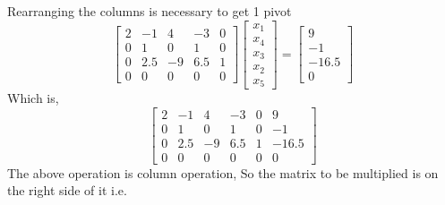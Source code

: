 \documentclass[11pt,a4paper]{article}
\begin{document}
Rearranging the columns is necessary to get 1 pivot
\[
    \begin{bmatrix}
        2 & -1    & 4  & -3  & 0\\
        0 & 1     & 0  & 1   & 0\\
        0 & 2.5   & -9 & 6.5 & 1\\
        0 & 0     & 0  & 0   & 0 
    \end{bmatrix} \begin{bmatrix}
                    x_1 \\ x_4 \\ x_3 \\ x_2 \\ x_5
                 \end{bmatrix} = \begin{bmatrix}
                                    9 \\ -1 \\ -16.5 \\ 0
                                 \end{bmatrix} \] Which is,
\[                                 
\left[{\begin{array}{ccccc|c}
        2 & -1    & 4  & -3  & 0 & 9\\
        0 & 1     & 0  & 1   & 0 & -1\\
        0 & 2.5   & -9 & 6.5 & 1 & -16.5\\
        0 & 0     & 0  & 0   & 0 & 0
\end{array}}\right]
\]
The above operation is column operation,
So the matrix to be multiplied is on the right side of it i.e.\\
\end{document}
